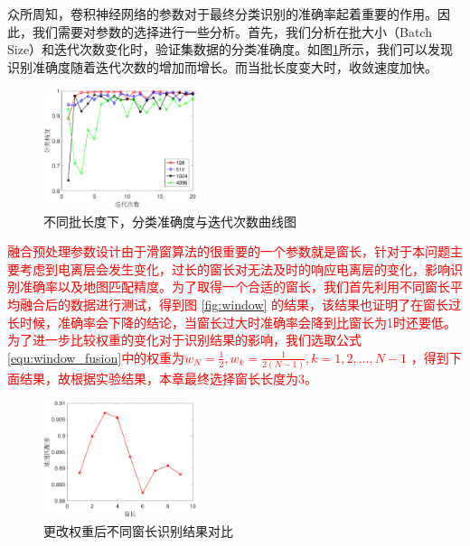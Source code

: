 众所周知，卷积神经网络的参数对于最终分类识别的准确率起着重要的作用。因此，我们需要对参数的选择进行一些分析。首先，我们分析在批大小（Batch Size）和迭代次数变化时，验证集数据的分类准确度。如图\ref{fig:epoch}所示，我们可以发现识别准确度随着迭代次数的增加而增长。而当批长度变大时，收敛速度加快。
\begin{figure}[H]
	\centering
	\includegraphics[width=0.4\textwidth]{figures/othr/epoch}
	\caption{不同批长度下，分类准确度与迭代次数曲线图}
	\label{fig:epoch}
\end{figure}

\textcolor{red}{融合预处理参数设计由于滑窗算法的很重要的一个参数就是窗长，针对于本问题主要考虑到电离层会发生变化，过长的窗长对无法及时的响应电离层的变化，影响识别准确率以及地图匹配精度。为了取得一个合适的窗长，我们首先利用不同窗长平均融合后的数据进行测试，得到图 \ref{fig:window} 的结果，该结果也证明了在窗长过长时候，准确率会下降的结论，当窗长过大时准确率会降到比窗长为1时还要低。为了进一步比较权重的变化对于识别结果的影响，我们选取公式\ref{equ:window_fusion}中的权重为$w_N=\frac{1}{2},w_k=\frac{1}{2(N-1)},k=1,2,\dots,N-1$
，得到下面结果，故根据实验结果，本章最终选择窗长长度为3。
}

\begin{figure}[H]
	\centering
	\includegraphics[width=0.4\textwidth]{figures/othr/window}
	\caption{更改权重后不同窗长识别结果对比}
	\label{fig:window2}
\end{figure}

